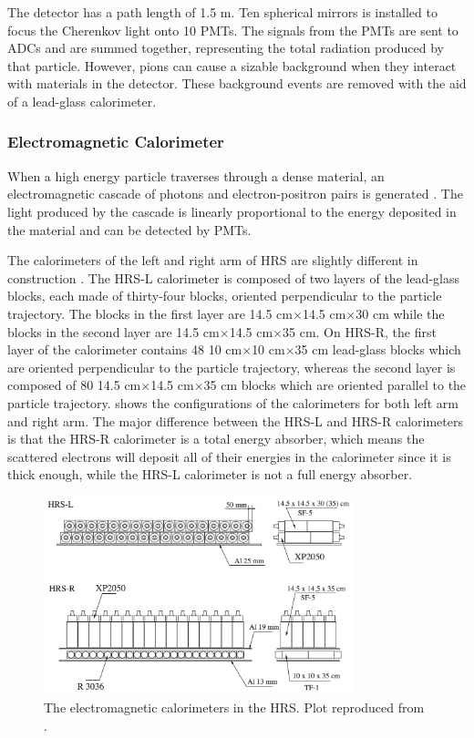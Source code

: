 The detector has a path length of 1.5 m. Ten spherical mirrors is installed to focus the Cherenkov light onto 10 PMTs. The signals from the PMTs are sent to ADCs and are summed together, representing the total radiation produced by that particle. However, pions can cause a sizable background when they interact with materials in the detector. These background events are removed with the aid of a lead-glass calorimeter.

\subsubsection{Electromagnetic Calorimeter}

When a high energy particle traverses through a dense material, an electromagnetic cascade of photons and electron-positron pairs is generated \cite{Leo1994}. The light produced by the cascade is linearly proportional to the energy deposited in the material and can be detected by PMTs.

The calorimeters of the left and right arm of HRS are slightly different in construction \cite{Alcorn2004}. The HRS-L calorimeter is composed of two layers of the lead-glass blocks, each made of thirty-four blocks, oriented perpendicular to the particle trajectory. The blocks in the first layer are 14.5 cm$\times$14.5 cm$\times$30 cm while the blocks in the second layer are 14.5 cm$\times$14.5 cm$\times$35 cm. On HRS-R, the first layer of the calorimeter contains 48 10 cm$\times$10 cm$\times$35 cm lead-glass blocks which are oriented perpendicular to the particle trajectory, whereas the second layer is composed of 80 14.5 cm$\times$14.5 cm$\times$35 cm blocks which are oriented parallel to the particle trajectory.  shows the configurations of the calorimeters for both left arm and right arm. The major difference between the HRS-L and HRS-R calorimeters is that the HRS-R calorimeter is a total energy absorber, which means the scattered electrons will deposit all of their energies in the calorimeter since it is thick enough, while the HRS-L calorimeter is not a full energy absorber.

\begin{figure}[tb!]
  \centering
  \includegraphics[width=0.8\textwidth]{figs/calorimeters.png}
  \caption[The electromagnetic calorimeters in the HRS.]{The electromagnetic calorimeters in the HRS. Plot reproduced from \cite{Alcorn2004}. \label{C5S4SS2F5}}
\end{figure}


